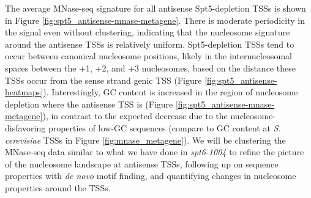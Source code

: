 \documentclass[9pt, letterpaper]{article}
\begin{document}

The average MNase-seq signature for all antisense Spt5-depletion TSSs is shown in Figure \ref{fig:spt5_antisense-mnase-metagene}. There is moderate periodicity in the signal even without clustering, indicating that the nucleosome signature around the antisense TSSs is relatively uniform. Spt5-depletion TSSs tend to occur between canonical nucleosome positions, likely in the internucleosomal spaces between the +1, +2, and +3 nucleosomes, based on the distance these TSSs occur from the sense strand genic TSS (Figure \ref{fig:spt5_antisense-heatmaps}). Interestingly, GC content is increased in the region of nucleosome depletion where the antisense TSS is (Figure \ref{fig:spt5_antisense-mnase-metagene}), in contrast to the expected decrease due to the nucleosome-disfavoring properties of low-GC sequences (compare to GC content at \textit{S. cerevisiae} TSSs in Figure \ref{fig:mnase_metagene}). We will be clustering the MNase-seq data similar to what we have done in \textit{spt6-1004} to refine the picture of the nucleosome landscape at antisense TSSs, following up on sequence properties with \textit{de novo} motif finding, and quantifying changes in nucleosome properties around the TSSs.

\newpage
{}

\end{document}
